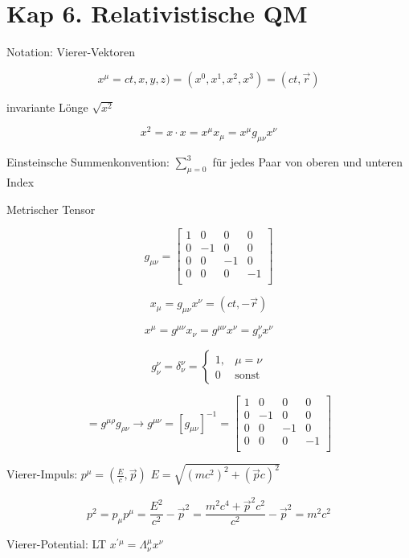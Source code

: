 



\setcounter{chapter}{5}
\chapter*{Kap 6. Relativistische QM}

Notation: Vierer-Vektoren

\[x^{\mu} = ct,x,y,z) = (x^0,x^1,x^2,x^3) = (ct,\vec r)\]

invariante Lönge \(\sqrt{x^2}\)

\[x^2=x\cdot x = x^{\mu}x_\mu = x^\mu g_{\mu \nu}x^\nu\]



Einsteinsche Summenkonvention: \(\sum_{\mu=0}^3\) für jedes Paar von oberen und unteren Index

Metrischer Tensor

\[ g_{\mu\nu} = \begin{bmatrix}
 1 & 0 & 0 & 0\\
 0 & -1 & 0 & 0\\
 0 & 0 & -1 & 0\\
 0 & 0 & 0 & -1\\
\end{bmatrix} \]

\[ x_\mu = g_{\mu\nu}x^\nu = (ct,-\vec r)\]

\[x^\mu = g^{\mu\nu}x_\nu = g^{\mu\nu}x^\nu = g^\nu_\nu x^\nu\] 

\[g^\nu_\nu = \delta^\nu_\nu =\begin{cases}
  1,  & \mu = \nu\\
  0 & \text{sonst}
\end{cases} \]

\[= g^{\mu\rho}g_{\rho\nu} \rightarrow  g^{\mu\nu} = [g_{\mu\nu}]^{-1} = \begin{bmatrix}
 1 & 0 & 0 & 0\\
 0 & -1 & 0 & 0\\
 0 & 0 & -1 & 0\\
 0 & 0 & 0 & -1\\
\end{bmatrix} \]

Vierer-Impuls: \(p^\mu=(\frac{E}{c},\vec p)\) \(E= \sqrt{(mc^2)^2+(\vec p c)^2}\)

\[p^2 = p_\mu p^\mu = \frac{E^2}{c^2}-\vec p^2 = \frac{m^2c^4+\vec p^2 c^2}{c^2} - \vec p^2 = m^2c^2\]

Vierer-Potential:  LT \(x^{'\mu} = \Lambda^{\mu}_\nu x^\nu\)

